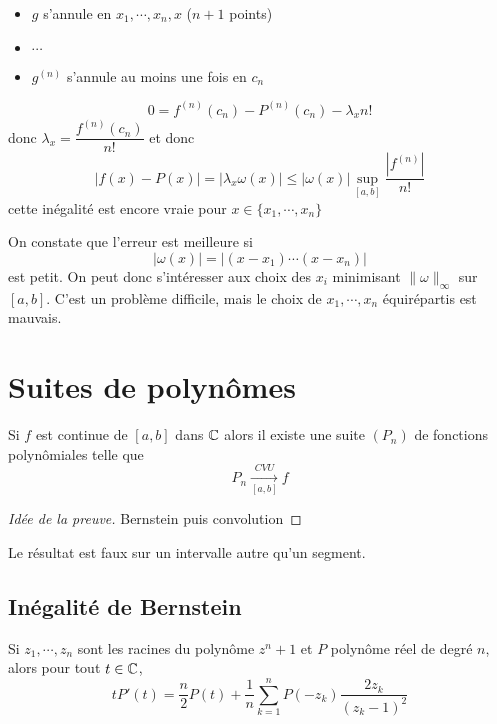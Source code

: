 \begin{itemize}
    \item
$g$ s'annule en $x_1, \cdots, x_n, x$ ($n+1$ points)
\item $\cdots$
\item
$g^{(n)}$ s'annule au moins une fois en $c_n$
\end{itemize}

\[
    0=f^{(n)}(c_n)-P^{(n)}(c_n)-\lambda_x n!
\]
donc $\lambda_x = \dfrac{f^{(n)}(c_n)}{n!}$ et donc \[
    |f(x)-P(x)|=|\lambda_x\omega (x)|\leq |\omega(x)|\sup_{[a, b]}\frac{|f^{(n)}|}{n!}
\]
cette inégalité est encore vraie pour $x\in\{x_1, \cdots, x_n\}$

\begin{rem}
On constate que l'erreur est meilleure si \[
    |\omega(x)|=|(x-x_1)\cdots (x-x_n)|
\]
est petit. On peut donc s'intéresser aux choix des $x_i$ minimisant $\|\omega\|_\infty$ sur $[a, b]$. C'est un problème difficile, mais le choix de $x_1, \cdots, x_n$ équirépartis est mauvais.
\end{rem}

\section{Suites de polynômes}

\begin{thm}[Weierstrass]
    Si $f$ est continue de $[a, b]$ dans $\mathbb C$ alors il existe une suite $(P_n)$ de fonctions polynômiales telle que \[
        P_n\xrightarrow[{[a, b]}]{CVU} f
    \]
\end{thm}

\begin{proof}[Idée de la preuve]
    Bernstein puis convolution
\end{proof}

\begin{rem}
Le résultat est faux sur un intervalle autre qu'un segment.
\end{rem}

\subsection{Inégalité de Bernstein}


\begin{lmm}
Si $z_1, \cdots, z_n$ sont les racines du polynôme $z^n+1$ et $P$ polynôme réel de degré $n$, alors pour tout $t\in\mathbb C$, \[
    tP'(t)=\frac n2P(t)+\frac 1n\sum_{k=1}^nP(-z_k)\frac{2z_k}{(z_k-1)^2}
\]
\end{lmm}


